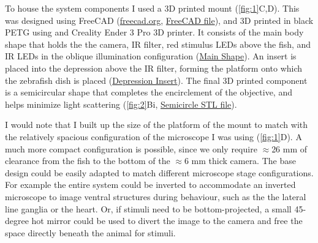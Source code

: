 \documentclass[9pt,lineno]{RandlettLab_elife}
\begin{document}
To house the system components I used a 3D printed mount (\autoref{fig:1}C,D). This was designed using FreeCAD  (\href{https://www.freecad.org/}{freecad.org}, \href{https://github.com/owenrandlett/pi_tailtrack/blob/main/3d_printing/pi_tailtrack_mount.FCStd}{FreeCAD file}), and 3D printed in black PETG using and Creality Ender 3 Pro 3D printer. It consists of the main body shape that holds the the camera, IR filter, red stimulus LEDs above the fish, and IR LEDs in the oblique illumination configuration (\href{https://github.com/owenrandlett/pi_tailtrack/blob/main/3d_printing/pi_tailtrack_mount_MainShape.stl}{Main Shape}). An insert is placed into the depression above the IR filter, forming the platform onto which the zebrafish dish is placed (\href{https://github.com/owenrandlett/pi_tailtrack/blob/main/3d_printing/pi_tailtrack_mount_CameraDepressionInsert.stl}{Depression Insert}). The final 3D printed component is a semicircular shape that completes the encirclement of the objective, and helps minimize light scattering (\autoref{fig:2}Bi, \href{https://github.com/owenrandlett/pi_tailtrack/blob/main/3d_printing/pi_tailtrack_mount_Semicircle.stl}{Semicircle STL file}).  

I would note that I built up the size of the platform of the mount to match with the relatively spacious configuration of the microscope I was using (\autoref{fig:1}D). A much more compact configuration is possible, since we only require $\approx$26 mm of clearance from the fish to the bottom of the $\approx$6 mm thick camera. The base design could be easily adapted to match different microscope stage configurations. For example the entire system could be inverted to accommodate an inverted microscope to image ventral structures during behaviour, such as the the lateral line ganglia or the heart. Or, if stimuli need to be bottom-projected, a small 45-degree hot mirror could be used to divert the image to the camera and free the space directly beneath the animal for stimuli. 
\end{document}
